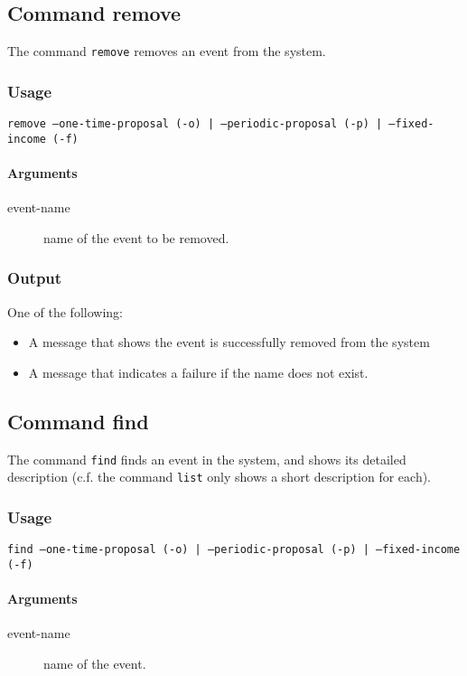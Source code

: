 \subsection{Command remove}
The command \texttt{remove} removes an event from the system.
\subsubsection{Usage}
\begin{center}
	\texttt{remove --one-time-proposal (-o) | --periodic-proposal (-p) | --fixed-income (-f)} 
\end{center}

\paragraph{Arguments}
\begin{description}
	\item[event-name] name of the event to be removed.
\end{description}

\subsubsection{Output}
One of the following:
\begin{itemize}
	\item A message that shows the event is successfully removed from the system
	\item A message that indicates a failure if the name does not exist.
\end{itemize}

\subsection{Command find}
The command \texttt{find} finds an event in the system, and shows its detailed description (c.f. the command \texttt{list} only shows a short description for each).
\subsubsection{Usage}
\begin{center}
	\texttt{find --one-time-proposal (-o) | --periodic-proposal (-p) | --fixed-income (-f)} 
\end{center}

\paragraph{Arguments}
\begin{description}
	\item[event-name] name of the event.
\end{description}

